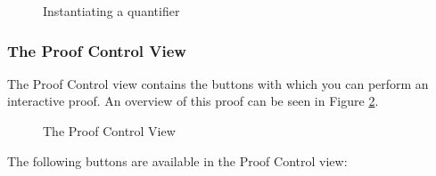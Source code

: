 \begin{figure}[!ht]
\begin{center}
	\caption{Instantiating a quantifier}
	\label{fig_ref_01_proving_perspective5}
\end{center}
\end{figure}

\subsubsection{The Proof Control View}
\label{proof_control_view}

The \textsf{Proof Control} view contains the buttons with which you can perform an interactive proof. An overview of this proof can be seen in Figure \ref{fig_ref_01_proving_perspective6}.

\begin{figure}[!ht]
\begin{center}
	\caption{The Proof Control View}
	\label{fig_ref_01_proving_perspective6}
\end{center}
\end{figure}

The following buttons are available in the \textsf{Proof Control} view:

